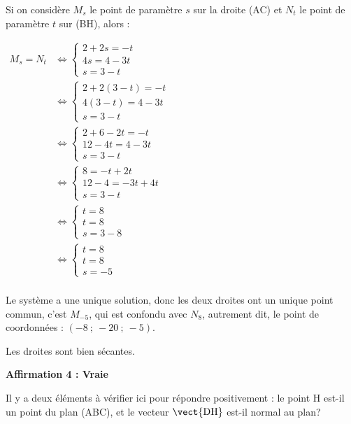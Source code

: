 Si on considère $M_s$ le point de paramètre $s$ sur la droite (AC) et $N_t$ le point de paramètre $t$ sur (BH), alors :

$\begin{aligned} M_s = N_t &\iff \begin{cases} 2+2s =  - t\\4s = 4 - 3t\\s=3 - t\end{cases}\\
&\iff \begin{cases} 2+2(3-t) =  - t\\4(3-t) = 4 - 3t\\s=3 - t\end{cases}\\
&\iff \begin{cases} 2+6-2t =  - t\\12-4t = 4 - 3t\\s=3 - t\end{cases}\\
&\iff \begin{cases} 8 =  -t+2t\\12-4 =  - 3t+4t\\s=3 - t\end{cases}\\
&\iff \begin{cases} t=8\\t=8\\s=3 - 8\end{cases}\\
&\iff \begin{cases} t=8\\t=8\\s=-5\end{cases}\\
\end{aligned}$

Le système a une unique solution, donc les deux droites ont un unique point commun, c'est $M_{-5}$, qui est confondu avec $N_8$, autrement dit, le point de coordonnées : $(-8~;~ -20~;~-5)$.

Les droites sont bien sécantes.
\medskip





\textbf{Affirmation 4 : Vraie}

Il y a deux éléments à vérifier ici pour répondre positivement : le point H est-il un point du plan (ABC), et le vecteur $\vect{\mathrm{DH}}$ est-il normal au plan?

